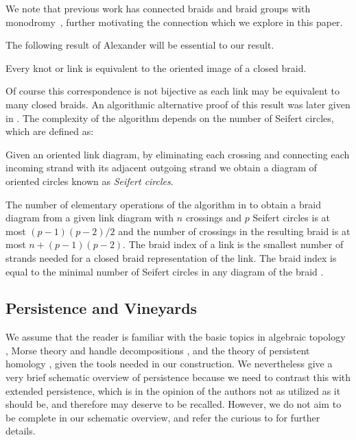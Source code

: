 \documentclass[twoside,leqno]{article}
\begin{document}
We note that previous work has connected braids and braid groups with monodromy~\cite{CogolludoAgustn2011, Cohen1997, salter2023stratifiedbraidgroupsmonodromy, Salter2024}, further motivating the connection which we explore in this paper.

%

%
The following result of Alexander will be essential to our result.
\begin{theorem} \label{thm:Alexander}
    Every knot or link is equivalent to the oriented image of a closed braid.
\end{theorem}
Of course this correspondence is not bijective as each link may be equivalent to many closed braids.  An algorithmic alternative proof of this result was later given in \cite{Vogel1990}.  
The complexity of the algorithm depends on the number of Seifert circles, which are defined as:
\begin{definition}
Given an oriented link diagram, by eliminating each crossing and connecting each incoming strand with its adjacent outgoing strand we obtain a diagram of oriented circles known as \emph{Seifert circles}. %
\end{definition}
The number of elementary operations of the algorithm in \cite{Vogel1990} to obtain a braid diagram from a given link diagram with $n$ crossings and $p$ Seifert circles is at most $(p-1)(p-2)/2$ and the number of crossings in the resulting braid is at most $n + (p-1)(p-2)$. 
%
The braid index of a link is the smallest number of strands needed for a closed braid representation of the link. The braid index is equal to the minimal number of Seifert circles in any diagram of the braid \cite{yamada1987index}. %
%



%
%
%

%


\subsection{Persistence and Vineyards}

We  assume that the reader is familiar with the basic topics in algebraic topology \cite{munkres2018elements, hatcher2002algebraic}, Morse theory and handle decompositions \cite{milnor1963morse}, and the theory of  persistent homology \cite{Dey2022, Oudot2015}, given the tools needed in our construction. We nevertheless give a very brief schematic overview of persistence because we need to contrast this with extended persistence, which is in the opinion of the authors not as utilized as it should be, and therefore may deserve to be recalled. However, we do not aim to be complete in our schematic overview, and refer the curious to \cite{Dey2022, Oudot2015} for further details. 
\end{document}
